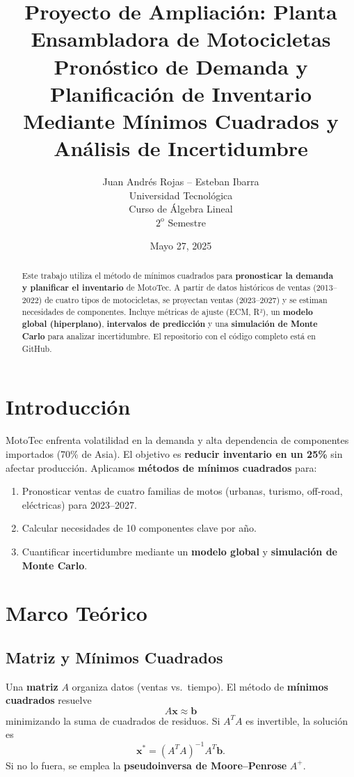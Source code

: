 \documentclass[12pt,a4paper]{article}
\title{\vspace{-1cm}
    Proyecto de Ampliación: Planta Ensambladora de Motocicletas \\
    \large Pronóstico de Demanda y Planificación de Inventario Mediante Mínimos Cuadrados y Análisis de Incertidumbre
}
\author{
    Juan Andrés Rojas – Esteban Ibarra \\
    Universidad Tecnológica \\
    Curso de Álgebra Lineal \\
    $2^{\text{o}}$ Semestre
}
\date{Mayo 27, 2025}
\begin{document}
\maketitle
\thispagestyle{empty}

\begin{abstract}\small
Este trabajo utiliza el método de mínimos cuadrados para \textbf{pronosticar la demanda y planificar el inventario} de MotoTec. A partir de datos históricos de ventas (2013–2022) de cuatro tipos de motocicletas, se proyectan ventas (2023–2027) y se estiman necesidades de componentes. Incluye métricas de ajuste (ECM, R²), un \textbf{modelo global (hiperplano)}, \textbf{intervalos de predicción} y una \textbf{simulación de Monte Carlo} para analizar incertidumbre. El repositorio con el código completo está en GitHub.
\end{abstract}

\section{Introducción}
MotoTec enfrenta volatilidad en la demanda y alta dependencia de componentes importados (70\% de Asia). El objetivo es \textbf{reducir inventario en un 25\%} sin afectar producción. Aplicamos \textbf{métodos de mínimos cuadrados} para:
\begin{enumerate}
    \item Pronosticar ventas de cuatro familias de motos (urbanas, turismo, off-road, eléctricas) para 2023–2027.
    \item Calcular necesidades de 10 componentes clave por año.
    \item Cuantificar incertidumbre mediante un \textbf{modelo global} y \textbf{simulación de Monte Carlo}.
\end{enumerate}

\section{Marco Teórico}
\subsection{Matriz y Mínimos Cuadrados}
Una \textbf{matriz} $A$ organiza datos (ventas vs.\ tiempo). El método de \textbf{mínimos cuadrados} resuelve
\[
A\mathbf{x} \approx \mathbf{b}
\]
minimizando la suma de cuadrados de residuos. Si $A^T A$ es invertible, la solución es
\[
\mathbf{x}^* = (A^T A)^{-1} A^T \mathbf{b}.
\]
Si no lo fuera, se emplea la \textbf{pseudoinversa de Moore–Penrose} $A^+$.
\end{document}
